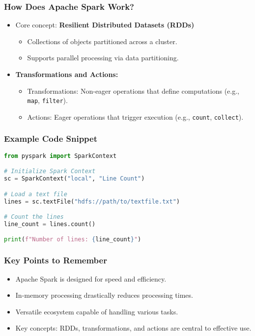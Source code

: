 \documentclass[aspectratio=169]{beamer}
\begin{document}
\begin{frame}[fragile]
    \frametitle{How Does Apache Spark Work?}
    \begin{itemize}
        \item Core concept: \textbf{Resilient Distributed Datasets (RDDs)}
        \begin{itemize}
            \item Collections of objects partitioned across a cluster.
            \item Supports parallel processing via data partitioning.
        \end{itemize}
        \item \textbf{Transformations and Actions:}
        \begin{itemize}
            \item Transformations: Non-eager operations that define computations (e.g., \texttt{map}, \texttt{filter}).
            \item Actions: Eager operations that trigger execution (e.g., \texttt{count}, \texttt{collect}).
        \end{itemize}
    \end{itemize}
\end{frame}

\begin{frame}[fragile]
    \frametitle{Example Code Snippet}
    \begin{lstlisting}[language=Python]
from pyspark import SparkContext

# Initialize Spark Context
sc = SparkContext("local", "Line Count")

# Load a text file
lines = sc.textFile("hdfs://path/to/textfile.txt")

# Count the lines
line_count = lines.count()

print(f"Number of lines: {line_count}")
    \end{lstlisting}
\end{frame}

\begin{frame}[fragile]
    \frametitle{Key Points to Remember}
    \begin{itemize}
        \item Apache Spark is designed for speed and efficiency.
        \item In-memory processing drastically reduces processing times.
        \item Versatile ecosystem capable of handling various tasks.
        \item Key concepts: RDDs, transformations, and actions are central to effective use.
    \end{itemize}
\end{frame}
\end{document}
